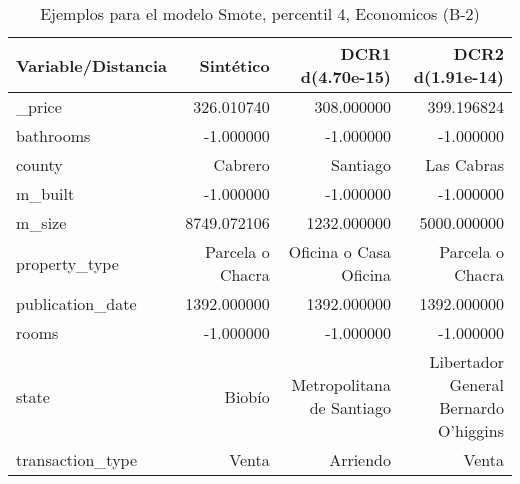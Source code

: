 \begin{table}[H]
\centering
\fontsize{10}{14}\selectfont
\caption{Ejemplos para el modelo Smote, percentil 4, Economicos (B-2)}
\label{table-example-economicos-b-2-smote-enc-4p}
\begin{tabular}{|l|r|r|r|}
\hline
\rowcolor[gray]{0.8}
Variable/Distancia & Sintético & DCR1 d(4.70e-15) & DCR2 d(1.91e-14) \\
\hline \_price & \cellcolor[rgb]{0.9, 0.54, 0.52} 326.010740 & 308.000000 & 399.196824 \\
\hline bathrooms & \cellcolor[rgb]{0.9, 0.54, 0.52} -1.000000 & \cellcolor[rgb]{0.9, 0.54, 0.52} -1.000000 & \cellcolor[rgb]{0.9, 0.54, 0.52} -1.000000 \\
\hline county & \cellcolor[rgb]{0.9, 0.54, 0.52} Cabrero & Santiago & Las Cabras \\
\hline m\_built & \cellcolor[rgb]{0.9, 0.54, 0.52} -1.000000 & \cellcolor[rgb]{0.9, 0.54, 0.52} -1.000000 & \cellcolor[rgb]{0.9, 0.54, 0.52} -1.000000 \\
\hline m\_size & \cellcolor[rgb]{0.9, 0.54, 0.52} 8749.072106 & 1232.000000 & 5000.000000 \\
\hline property\_type & \cellcolor[rgb]{0.9, 0.54, 0.52} Parcela o Chacra & Oficina o Casa Oficina & \cellcolor[rgb]{0.9, 0.54, 0.52} Parcela o Chacra \\
\hline publication\_date & \cellcolor[rgb]{0.9, 0.54, 0.52} 1392.000000 & \cellcolor[rgb]{0.9, 0.54, 0.52} 1392.000000 & \cellcolor[rgb]{0.9, 0.54, 0.52} 1392.000000 \\
\hline rooms & \cellcolor[rgb]{0.9, 0.54, 0.52} -1.000000 & \cellcolor[rgb]{0.9, 0.54, 0.52} -1.000000 & \cellcolor[rgb]{0.9, 0.54, 0.52} -1.000000 \\
\hline state & \cellcolor[rgb]{0.9, 0.54, 0.52} Biobío & Metropolitana de Santiago & Libertador General Bernardo O'higgins \\
\hline transaction\_type & \cellcolor[rgb]{0.9, 0.54, 0.52} Venta & Arriendo & \cellcolor[rgb]{0.9, 0.54, 0.52} Venta \\
\hline
\end{tabular}
\end{table}
